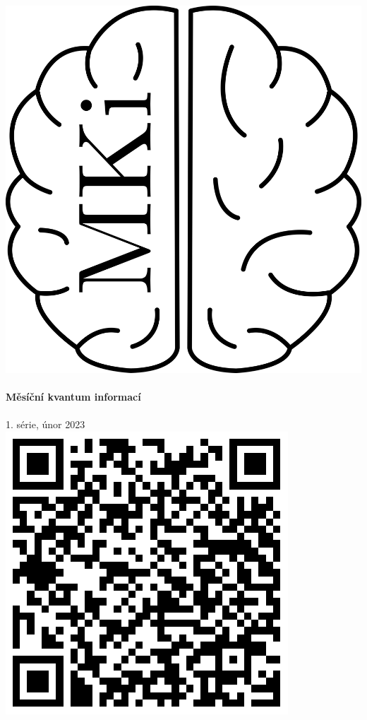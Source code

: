 \documentclass[12pt]{article}
\begin{document}
\thispagestyle{firststyle}
\vspace*{\fill}
\begin{center}
\includegraphics[scale=1]{../../../propagace/logo/mkilogo.png}\\
\quad\\
\textbf{\Huge{Měsíční kvantum informací}}\\
\quad\\
\LARGE{1. série, únor 2023}
\includegraphics{../../../propagace/qrcodes/batch1el.png}
\end{center}
\vspace*{\fill}
\end{document}
